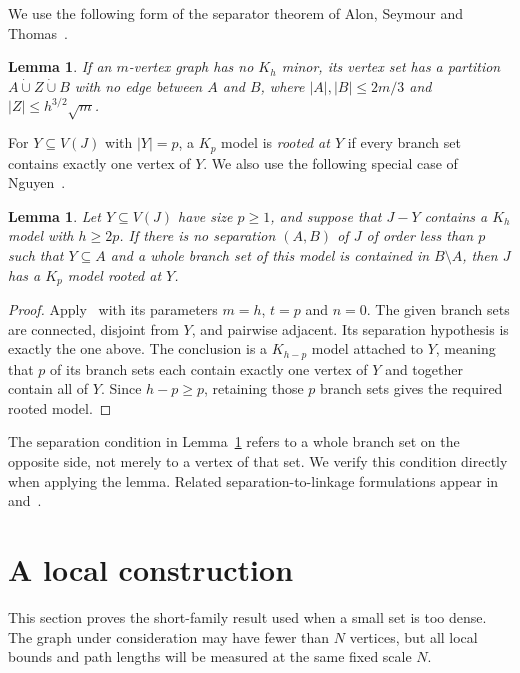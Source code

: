 \documentclass[10pt,letterpaper]{article}
\newtheorem{lemma}[theorem]{Lemma}
\theoremstyle{definition}
\theoremstyle{remark}
\newcommand{\dcup}{\mathbin{\dot\cup}}
\begin{document}
We use the following form of the separator theorem of Alon, Seymour and Thomas~\cite[Theorem~(1.2)]{AST}.

\begin{lemma}\label{lem:AST}
If an $m$-vertex graph has no $K_h$ minor, its vertex set has a partition $A\dcup Z\dcup B$ with no edge between $A$ and $B$, where $|A|,|B|\le2m/3$ and $|Z|\le h^{3/2}\sqrt m$.
\end{lemma}

For $Y\subseteq V(J)$ with $|Y|=p$, a $K_p$ model is \emph{rooted at $Y$} if every branch set contains exactly one vertex of $Y$. We also use the following special case of Nguyen~\cite[Lemma~5.7]{Nguyen}.

\begin{lemma}\label{lem:rooted}
Let $Y\subseteq V(J)$ have size $p\ge1$, and suppose that $J-Y$ contains a $K_h$ model with $h\ge2p$. If there is no separation $(A,B)$ of $J$ of order less than $p$ such that $Y\subseteq A$ and a whole branch set of this model is contained in $B\setminus A$, then $J$ has a $K_p$ model rooted at $Y$.
\end{lemma}
\begin{proof}
Apply~\cite[Lemma~5.7]{Nguyen} with its parameters $m=h$, $t=p$ and $n=0$. The given branch sets are connected, disjoint from $Y$, and pairwise adjacent. Its separation hypothesis is exactly the one above. The conclusion is a $K_{h-p}$ model attached to $Y$, meaning that $p$ of its branch sets each contain exactly one vertex of $Y$ and together contain all of $Y$. Since $h-p\ge p$, retaining those $p$ branch sets gives the required rooted model.
\end{proof}

The separation condition in Lemma~\ref{lem:rooted} refers to a whole branch set on the opposite side, not merely to a vertex of that set. We verify this condition directly when applying the lemma. Related separation-to-linkage formulations appear in~\cite[Theorem~(5.4)]{RS} and~\cite[Theorem~4.1]{KKR}.

\section{A local construction}\label{sec:local}

This section proves the short-family result used when a small set is too dense. The graph under consideration may have fewer than $N$ vertices, but all local bounds and path lengths will be measured at the same fixed scale $N$.
\end{document}
